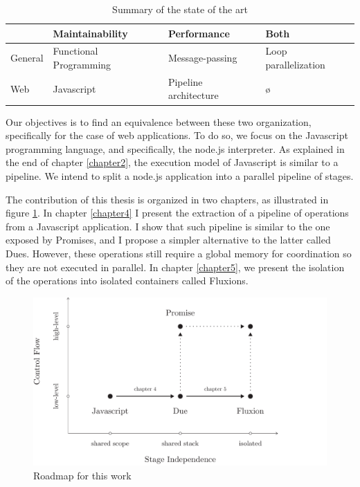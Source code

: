 
\begin{table}
\begin{tabular}{l|l|l|l}
             & Maintainability         & Performance           & Both\\\hline
General      & Functional Programming  & Message-passing       & Loop parallelization\\
Web          & Javascript              & Pipeline architecture & ø
\end{tabular}
\caption{Summary of the state of the art}
\label{tab:chapter3:objectives:summary}
\end{table}

Our objectives is to find an equivalence between these two organization, specifically for the case of web applications.
To do so, we focus on the Javascript programming language, and specifically, the node.js interpreter.
As explained in the end of chapter \ref{chapter2}, the execution model of Javascript is similar to a pipeline.
We intend to split a node.js application into a parallel pipeline of stages.

The contribution of this thesis is organized in two chapters, as illustrated in figure \ref{fig:chapter3:objectives:roadmap}.
In chapter \ref{chapter4} I present the extraction of a pipeline of operations from a Javascript application.
I show that such pipeline is similar to the one exposed by Promises, and I propose a simpler alternative to the latter called Dues.
However, these operations still require a global memory for coordination so they are not executed in parallel.
In chapter \ref{chapter5}, we present the isolation of the operations into isolated containers called Fluxions. 

\begin{figure}[h!]
\includegraphics[width=1\textwidth]{../ressources/roadmap.pdf}
\caption{Roadmap for this work}
\label{fig:chapter3:objectives:roadmap}
\end{figure}

